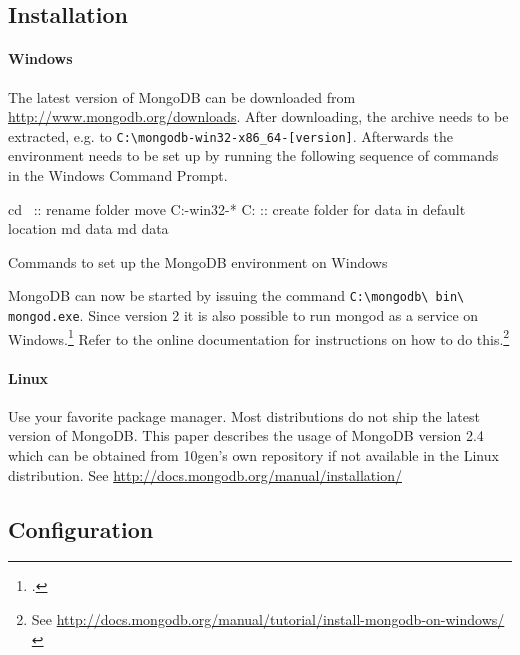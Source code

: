 \subsection{Installation}
\label{sec:installation}

\paragraph{Windows}
\label{sec:installation-windows}
The latest version of MongoDB can be downloaded from \url{http://www.mongodb.org/downloads}.
After downloading, the archive needs to be extracted, e.g. to \texttt{C:\textbackslash \-mongo\-db-win32-x86\-\_64-[version]}.
Afterwards the environment needs to be set up by running the following sequence of commands in the
Windows Command Prompt.

\begin{listing}
    \begin{batcode}
cd \
:: rename folder
move C:\mongodb-win32-* C:\mongodb
:: create folder for data in default location
md data
md data\db
    \end{batcode}
    \caption{Commands to set up the MongoDB environment on Windows}
    \label{lst:win-setup}
\end{listing}

MongoDB can now be started by issuing the command \texttt{C:\textbackslash mongodb\textbackslash\- bin\textbackslash\- mongod.exe}.
Since version 2 it is also possible to run mongod as a service on Windows.\footcite[Cf.][]{mongo_install_win} Refer
to the online documentation for instructions on how to do 
this.\footnote{See \url{http://docs.mongodb.org/manual/tutorial/install-mongodb-on-windows/}}

\paragraph{Linux}
\label{sec:installation-linux}
Use your favorite package manager.
Most distributions do not ship the latest version of MongoDB. This paper describes the usage of
MongoDB version 2.4 which can be obtained from 10gen's own repository if not available in the
Linux distribution. See \url{http://docs.mongodb.org/manual/installation/}

\subsection{Configuration}
\label{sec:configuration}

